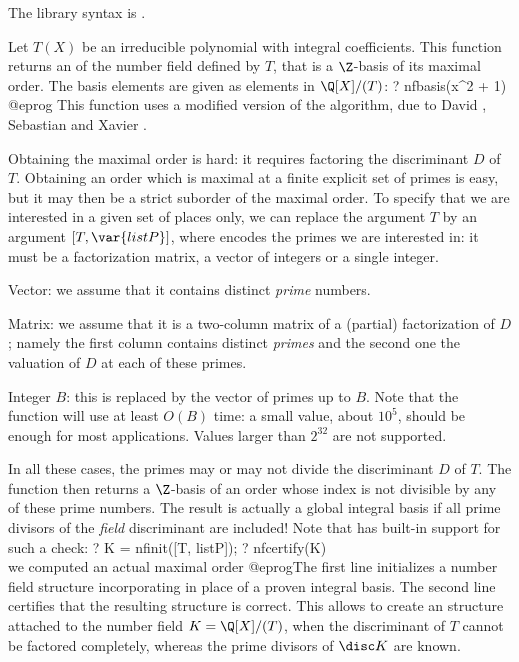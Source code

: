 The library syntax is .

\label{se:nfbasis}
Let $T(X)$ be an irreducible polynomial with integral coefficients. This
function returns an  of the number field defined by $T$,
that is a $\Z$-basis of its maximal order. The basis elements are given as
elements in $\Q[X]/(T)$:
\bprog
? nfbasis(x^2 + 1)
@eprog
This function uses a modified version of the  algorithm,
due to David , Sebastian  and Xavier .


Obtaining the maximal order is hard: it requires factoring the discriminant
$D$ of $T$. Obtaining an order which is maximal at a finite explicit set of
primes is easy, but it may then be a strict suborder of the maximal order. To
specify that we are interested in a given set of places only, we can replace
the argument $T$ by an argument $[T,\var{listP}]$, where  encodes
the primes we are interested in: it must be a factorization matrix, a vector
of integers or a single integer.

\item Vector: we assume that it contains distinct \emph{prime} numbers.

\item Matrix: we assume that it is a two-column matrix of a
(partial) factorization of $D$; namely the first column contains
distinct \emph{primes} and the second one the valuation of $D$ at each of
these primes.

\item Integer $B$: this is replaced by the vector of primes up to $B$. Note
that the function will use at least $O(B)$ time: a small value, about
$10^5$, should be enough for most applications. Values larger than $2^{32}$
are not supported.

In all these cases, the primes may or may not divide the discriminant $D$
of $T$. The function then returns a $\Z$-basis of an order whose index is
not divisible by any of these prime numbers. The result is actually a global
integral basis if all prime divisors of the \emph{field} discriminant are
included! Note that  has built-in support for such
a check:
\bprog
? K = nfinit([T, listP]);
? nfcertify(K)   \\ we computed an actual maximal order
@eprog\noindent The first line initializes a number field structure
incorporating  in place of a proven integral basis.
The second line certifies that the resulting structure is correct. This
allows to create an  structure attached to the number field $K =
\Q[X]/(T)$, when the discriminant of $T$ cannot be factored completely,
whereas the prime divisors of $\disc K$ are known.

